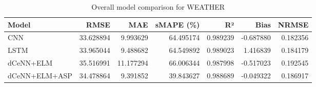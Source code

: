 \begin{table}
\caption{Overall model comparison for WEATHER}
\begin{tabular}{lrrrrrr}
\toprule
Model & RMSE & MAE & sMAPE (\%) & R² & Bias & NRMSE \\
\midrule
CNN & 33.628894 & 9.993629 & 64.495174 & 0.989239 & -0.687880 & 0.182356 \\
LSTM & 33.965044 & 9.488682 & 64.549892 & 0.989023 & 1.416839 & 0.184179 \\
dCeNN+ELM & 35.516991 & 11.177294 & 66.006344 & 0.987998 & -0.517023 & 0.192545 \\
dCeNN+ELM+ASP & 34.478864 & 9.391852 & 39.843627 & 0.988689 & -0.049322 & 0.186917 \\
\bottomrule
\end{tabular}
\end{table}

